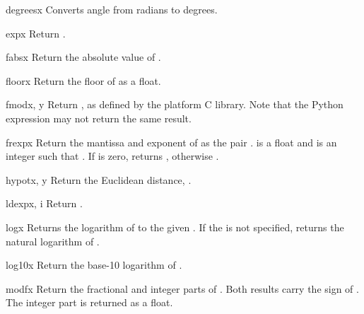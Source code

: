 \begin{funcdesc}{degrees}{x}
Converts angle  from radians to degrees.
\end{funcdesc}

\begin{funcdesc}{exp}{x}
Return .
\end{funcdesc}

\begin{funcdesc}{fabs}{x}
Return the absolute value of .
\end{funcdesc}

\begin{funcdesc}{floor}{x}
Return the floor of  as a float.
\end{funcdesc}

\begin{funcdesc}{fmod}{x, y}
Return , as defined by the platform C library.
Note that the Python expression  may not return
the same result.
\end{funcdesc}

\begin{funcdesc}{frexp}{x}
Return the mantissa and exponent of  as the pair
.   is a float and  is an
integer such that .
If  is zero, returns , otherwise
.
\end{funcdesc}

\begin{funcdesc}{hypot}{x, y}
Return the Euclidean distance, .
\end{funcdesc}

\begin{funcdesc}{ldexp}{x, i}
Return .
\end{funcdesc}

\begin{funcdesc}{log}{x}
Returns the logarithm of  to the given .
If the  is not specified, returns the natural logarithm of .
\end{funcdesc}

\begin{funcdesc}{log10}{x}
Return the base-10 logarithm of .
\end{funcdesc}

\begin{funcdesc}{modf}{x}
Return the fractional and integer parts of .  Both results
carry the sign of .  The integer part is returned as a float.
\end{funcdesc}

